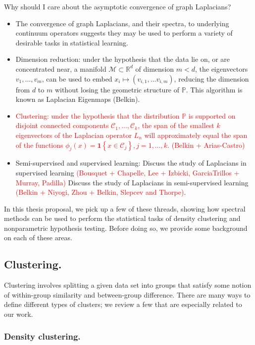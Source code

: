\documentclass{article}
\newcommand{\Reals}{\mathbb{R}}
\newcommand{\set}[1]{\left\{#1\right\}}
\newcommand{\1}{\mathbf{1}}
\newcommand{\Pbb}{\mathbb{P}}
\theoremstyle{alden}
\theoremstyle{aldenthm}
\theoremstyle{definition}
\theoremstyle{remark}
\begin{document}
Why should I care about the asymptotic convergence of graph Laplacians?
\begin{itemize}
	\item The convergence of graph Laplacians, and their spectra, to underlying continuum operators suggests they may be used to perform a variety of desirable tasks in statistical learning. 
	\item Dimension reduction: under the hypothesis that the data lie on, or are concentrated near, a manifold $\mathcal{M} \subset \Reals^d$ of dimension $m < d$, the eigenvectors $v_1,\ldots,v_m$, can be used to embed $x_i \mapsto (v_{i,1},\ldots v_{i,m})$, reducing the dimension from $d$ to $m$ without losing the geometric structure of $\Pbb$. This algorithm is known as Laplacian Eigenmaps (Belkin).
	\item \textcolor{red}{Clustering: under the hypothesis that the distribution $\Pbb$ is supported on disjoint connected components $\mathcal{C}_1,\ldots,\mathcal{C}_k$, the span of the smallest $k$ eigenvectors of the Laplacian operator $L_n$ will approximately equal the span of the functions $\phi_j(x) = \1\set{x \in \mathcal{C}_j}, j = 1,\ldots,k$.} \textcolor{red}{(Belkin + Arias-Castro)}
	\item Semi-supervised and supervised learning: Discuss the study of Laplacians in supervised learning \textcolor{red}{(Bousquet + Chapelle, Lee + Izbicki, GarciaTrillos + Murray, Padilla)} Discuss the study of Laplacians in semi-supervised learning \textcolor{red}{(Belkin + Niyogi, Zhou + Belkin, Slepcev and Thorpe)}. 
\end{itemize}

In this thesis proposal, we pick up a few of these threads, showing how spectral methods can be used to perform the statistical tasks of density clustering and nonparametric hypothesis testing. Before doing so, we provide some background on each of these areas.

\subsection{Clustering.}

Clustering involves splitting a given data set
into groups that satisfy some notion of within-group similarity and
between-group difference. There are many ways to define different types of clusters; we review a few that are especially related to our work. 

\subsubsection{Density clustering.}
\end{document}
